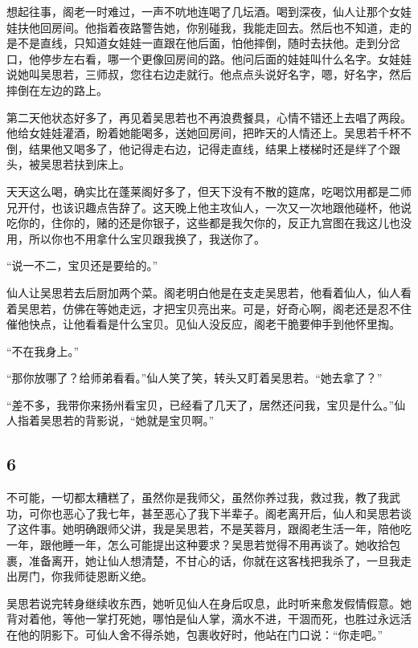 想起往事，阁老一时难过，一声不吭地连喝了几坛酒。喝到深夜，仙人让那个女娃娃扶他回房间。他指着夜路警告她，你别碰我，我能走回去。然后也不知道，走的是不是直线，只知道女娃娃一直跟在他后面，怕他摔倒，随时去扶他。走到分岔口，他停步左右看，哪一个更像回房间的路。他问后面的娃娃叫什么名字。女娃娃说她叫吴思若，三师叔，您往右边走就行。他点点头说好名字，嗯，好名字，然后摔倒在左边的路上。

第二天他状态好多了，再见着吴思若也不再浪费餐具，心情不错还上去唱了两段。他给女娃娃灌酒，盼着她能喝多，送她回房间，把昨天的人情还上。吴思若千杯不倒，结果他又喝多了，他记得走右边，记得走直线，结果上楼梯时还是绊了个跟头，被吴思若扶到床上。

天天这么喝，确实比在蓬莱阁好多了，但天下没有不散的筵席，吃喝饮用都是二师兄开付，也该识趣点告辞了。这天晚上他主攻仙人，一次又一次地跟他碰杯，他说
吃你的，住你的，赌的还是你银子，这些都是我欠你的，反正九宫图在我这儿也没用，所以你也不用拿什么宝贝跟我换了，我送你了。

“说一不二，宝贝还是要给的。”

仙人让吴思若去后厨加两个菜。阁老明白他是在支走吴思若，他看着仙人，仙人看着吴思若，仿佛在等她走远，才把宝贝亮出来。可是，好奇心啊，阁老还是忍不住催他快点，让他看看是什么宝贝。见仙人没反应，阁老干脆要伸手到他怀里掏。

“不在我身上。”

“那你放哪了？给师弟看看。”仙人笑了笑，转头又盯着吴思若。“她去拿了？”

“差不多，我带你来扬州看宝贝，已经看了几天了，居然还问我，宝贝是什么。”仙人指着吴思若的背影说，“她就是宝贝啊。”
\newline

{\centering\subsection{6}}

不可能，一切都太糟糕了，虽然你是我师父，虽然你养过我，救过我，教了我武功，可你也恶心了我七年，甚至恶心了我下半辈子。阁老离开后，仙人和吴思若谈了这件事。她明确跟师父讲，我是吴思若，不是芙蓉月，跟阁老生活一年，陪他吃一年，跟他睡一年，怎么可能提出这种要求？吴思若觉得不用再谈了。她收拾包裹，准备离开，她让仙人想清楚，不甘心的话，你就在这客栈把我杀了，一旦我走出房门，你我师徒恩断义绝。

吴思若说完转身继续收东西，她听见仙人在身后叹息，此时听来愈发假情假意。她背对着他，等他一掌打死她，哪怕是仙人掌，滴水不进，干涸而死，也胜过永远活在他的阴影下。可仙人舍不得杀她，包裹收好时，他站在门口说：“你走吧。”


